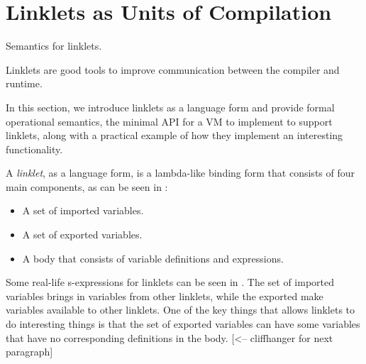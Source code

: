 	\section[\texorpdfstring{Linklets as Units of Compilation}{Semantics for Linklets}]{Linklets as Units of Compilation}
		\label{section:linklet-semantics}

		\begin{mainpoint}
			Semantics for linklets.

			Linklets are good tools to improve communication between the compiler and runtime.
		\end{mainpoint}

		\begin{paragraph-here}
			In this section, we introduce linklets as a language form and provide formal operational semantics, the minimal API for a VM to implement to support linklets, along with a practical example of how they implement an interesting functionality.
		\end{paragraph-here}


		\begin{paragraph-here}
			A \emph{linklet}, as a language form, is a lambda-like binding form that consists of four main components, as can be seen in :

			\begin{itemize}
				\item A set of imported variables.
				\item A set of exported variables.
				\item A body that consists of variable definitions and expressions.
			\end{itemize}

			Some real-life s-expressions for linklets can be seen in . The set of imported variables brings in variables from other linklets, while the exported make variables available to other linklets. One of the key things that allows linklets to do interesting things is that the set of exported variables can have some variables that have no corresponding definitions in the body. [<-- cliffhanger for next paragraph]
		\end{paragraph-here}



